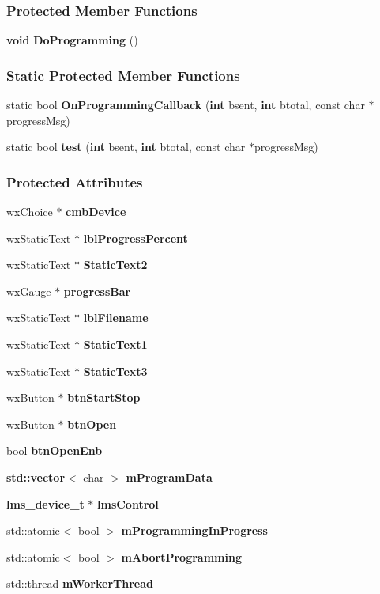 \subsubsection*{Protected Member Functions}
\begin{DoxyCompactItemize}
\item 
{\bf void} {\bf Do\+Programming} ()
\end{DoxyCompactItemize}
\subsubsection*{Static Protected Member Functions}
\begin{DoxyCompactItemize}
\item 
static bool {\bf On\+Programming\+Callback} ({\bf int} bsent, {\bf int} btotal, const char $\ast$progress\+Msg)
\item 
static bool {\bf test} ({\bf int} bsent, {\bf int} btotal, const char $\ast$progress\+Msg)
\end{DoxyCompactItemize}
\subsubsection*{Protected Attributes}
\begin{DoxyCompactItemize}
\item 
wx\+Choice $\ast$ {\bf cmb\+Device}
\item 
wx\+Static\+Text $\ast$ {\bf lbl\+Progress\+Percent}
\item 
wx\+Static\+Text $\ast$ {\bf Static\+Text2}
\item 
wx\+Gauge $\ast$ {\bf progress\+Bar}
\item 
wx\+Static\+Text $\ast$ {\bf lbl\+Filename}
\item 
wx\+Static\+Text $\ast$ {\bf Static\+Text1}
\item 
wx\+Static\+Text $\ast$ {\bf Static\+Text3}
\item 
wx\+Button $\ast$ {\bf btn\+Start\+Stop}
\item 
wx\+Button $\ast$ {\bf btn\+Open}
\item 
bool {\bf btn\+Open\+Enb}
\item 
{\bf std\+::vector}$<$ char $>$ {\bf m\+Program\+Data}
\item 
{\bf lms\+\_\+device\+\_\+t} $\ast$ {\bf lms\+Control}
\item 
std\+::atomic$<$ bool $>$ {\bf m\+Programming\+In\+Progress}
\item 
std\+::atomic$<$ bool $>$ {\bf m\+Abort\+Programming}
\item 
std\+::thread {\bf m\+Worker\+Thread}
\end{DoxyCompactItemize}
